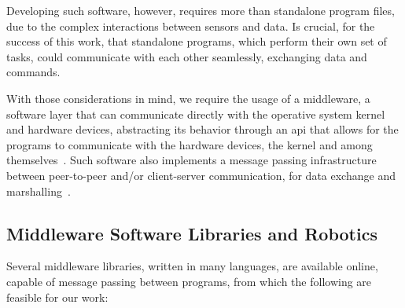Developing such software, however, requires more than standalone program files, due to the complex interactions between sensors and data. Is crucial, for the success of this work, that standalone programs, which perform their own set of tasks, could communicate with each other seamlessly, exchanging data and commands.

With those considerations in mind, we require the usage of a middleware, a software layer that can communicate directly with the operative system kernel and hardware devices, abstracting its behavior through an \ac{api} that allows for the programs to communicate with the hardware devices, the kernel and among themselves~\cite{Etzkorn2017, Huang2010}. Such software also implements a message passing infrastructure between peer-to-peer and/or client-server communication, for data exchange and marshalling~\cite{Etzkorn2017}.

\subsection{Middleware Software Libraries and Robotics} 
Several middleware libraries, written in many languages, are available online, capable of message passing between programs, from which the following are feasible for our work:

